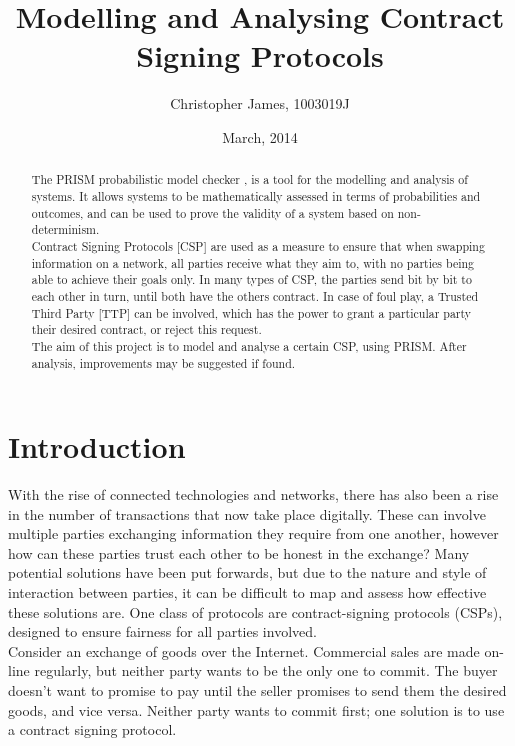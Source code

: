 \documentclass{l4proj}
\begin{document}
\title{Modelling and Analysing Contract Signing Protocols}
\author{Christopher James, 1003019J}
\date{March, 2014}
\maketitle

\begin{abstract}
The PRISM probabilistic model checker \cite{Pri}, is a tool for the modelling and analysis of systems. It allows systems to be mathematically assessed in terms of probabilities and outcomes, and can be used to prove the validity of a system based on non-determinism. \\
Contract Signing Protocols [CSP] are used as a measure to ensure that when swapping information on a network, all parties receive what they aim to, with no parties being able to achieve their goals only. In many types of CSP, the parties send bit by bit to each other in turn, until both have the others contract. In case of foul play, a Trusted Third Party [TTP] can be involved, which has the power to grant a particular party their desired contract, or reject this request. \\
The aim of this project is to model and analyse a certain CSP, using PRISM. After analysis, improvements may be suggested if found.
\end{abstract}

\educationalconsent
%
%
\tableofcontents

\chapter{Introduction}
With the rise of connected technologies and networks, there has also been a rise in the number of transactions that now take place digitally. These can involve multiple parties exchanging information they require from one another, however how can these parties trust each other to be honest in the exchange? Many potential solutions have been put forwards, but due to the nature and style of interaction between parties, it can be difficult to map and assess how effective these solutions are. One class of protocols are contract-signing protocols (CSPs), designed to ensure fairness for all parties involved.\\
Consider an exchange of goods over the Internet. Commercial sales are made on-line regularly, but neither party wants to be the only one to commit. The buyer doesn't want to promise to pay until the seller promises to send them the desired goods, and vice versa. Neither party wants to commit first; one solution is to use a contract signing protocol.
\end{document}
